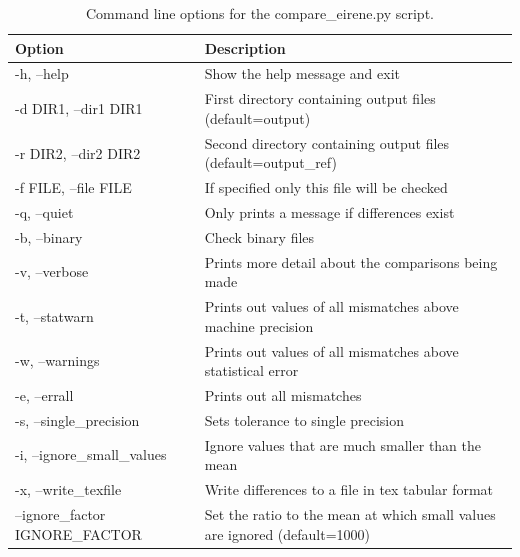 \begin{table}
  \begin{center}
    \begin{tabular}{ | p{4.2cm} | p{9cm} | }
      \hline
      Option  &  Description \\
      \hline
      -h, --help                  & Show the help message and exit                                \\
      -d DIR1, --dir1 DIR1        & First directory containing output files (default=output)      \\
      -r DIR2, --dir2 DIR2        & Second directory containing output files (default=output\_ref) \\
      -f FILE, --file FILE        & If specified only this file will be checked                   \\
      -q, --quiet                 & Only prints a message if differences exist                    \\
      -b, --binary                & Check binary files                                            \\
      -v, --verbose               & Prints more detail about the comparisons being made           \\
      -t, --statwarn              & Prints out values of all mismatches above machine precision   \\
      -w, --warnings              & Prints out values of all mismatches above statistical error   \\
      -e, --errall                & Prints out all mismatches                                     \\
      -s, --single\_precision     & Sets tolerance to single precision                            \\
      -i, --ignore\_small\_values & Ignore values that are much smaller than the mean             \\
      -x, --write\_texfile        & Write differences to a file in tex tabular format             \\
      --ignore\_factor \linebreak IGNORE\_FACTOR  & Set the ratio to the mean at which small values are ignored (default=1000) \\
      \hline
    \end{tabular}
    \caption{Command line options for the compare\_eirene.py script.\label{tab:compare_eirene}}
  \end{center}
\end{table}


